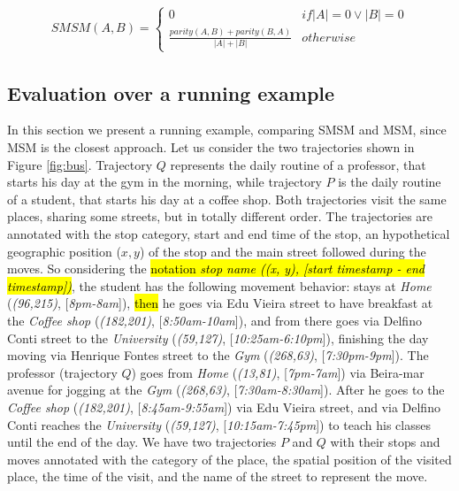 \documentclass[12pt]{article}
\begin{document}
\begin{equation}
\label{func:SMSM1}
\begin{split}
  SMSM(A, B) = 
  \begin{cases} 
      0 & if  |A| = 0 \vee |B| = 0 \\
      \frac{parity(A, B) + parity(B, A)}{|A| + |B|} & otherwise
  \end{cases}
\end{split}
\end{equation}



\subsection{Evaluation over a running example}

In this section we present a running example, comparing SMSM and MSM, since MSM is the closest approach.
Let us consider the two trajectories shown in Figure \ref{fig:bus}. Trajectory $Q$ represents the daily routine of a professor, that starts his day at the gym in the morning, while trajectory $P$ is the daily routine of a student, that starts his day at a coffee shop. Both trajectories visit the same places, sharing some streets, but in totally different order. The trajectories are annotated with the stop category, start and end time of the stop, an hypothetical geographic position ($x, y$) of the stop and the main street followed during the moves. So considering the \hl{notation \textit{stop name ((x, y), [start timestamp - end timestamp])}}, the student has the following movement behavior: stays at \textit{Home} (\textit{(96,215)}, [\textit{8pm-8am}]), \hl{then} he goes via Edu Vieira street to have breakfast at the \textit{Coffee shop} (\textit{(182,201)}, [\textit{8:50am-10am}]), and from there goes via Delfino Conti street to the \textit{University} (\textit{(59,127)}, [\textit{10:25am-6:10pm}]), finishing the day moving via Henrique Fontes street to the \textit{Gym} (\textit{(268,63)}, [\textit{7:30pm-9pm}]). The professor (trajectory $Q$) goes from \textit{Home} (\textit{(13,81)}, [\textit{7pm-7am}]) via Beira-mar avenue for jogging at the \textit{Gym} (\textit{(268,63)}, [\textit{7:30am-8:30am}]). After he goes to the \textit{Coffee shop} (\textit{(182,201)}, [\textit{8:45am-9:55am}]) via Edu Vieira street, and via Delfino Conti reaches the \textit{University} (\textit{(59,127)}, [\textit{10:15am-7:45pm}]) to teach his classes until the end of the day. We have two trajectories $P$ and $Q$ with their stops and moves annotated with the category of the place, the spatial position of the visited place, the time of the visit, and the name of the street to represent the move.
\end{document}
